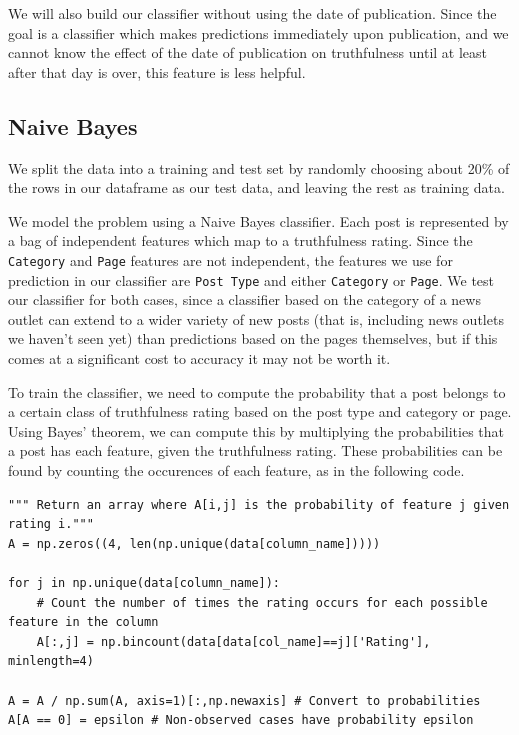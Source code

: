 \documentclass[12pt]{article}
\begin{document}
We will also build our classifier without using the date of publication. Since the goal is a classifier which makes predictions immediately upon publication, and we cannot know the effect of the date of publication on truthfulness until at least after that day is over, this feature is less helpful.


\subsection*{Naive Bayes}

We split the data into a training and test set by randomly choosing about 20\% of the rows in our dataframe as our test data, and leaving the rest as training data. 

We model the problem using a Naive Bayes classifier. Each post is represented by a bag of independent features which map to a truthfulness rating. Since the \texttt{Category} and \texttt{Page} features are not independent, the features we use for prediction in our classifier are \texttt{Post Type} and either \texttt{Category} or \texttt{Page}. We test our classifier for both cases, since a classifier based on the category of a news outlet can extend to a wider variety of new posts (that is, including news outlets we haven't seen yet) than predictions based on the pages themselves, but if this comes at a significant cost to accuracy it may not be worth it.

To train the classifier, we need to compute the probability that a post belongs to a certain class of truthfulness rating based on the post type and category or page. Using Bayes' theorem, we can compute this by multiplying the probabilities that a post has each feature, given the truthfulness rating. These probabilities can be found by counting the occurences of each feature, as in the following code.

\begin{lstlisting}
""" Return an array where A[i,j] is the probability of feature j given rating i."""
A = np.zeros((4, len(np.unique(data[column_name]))))

for j in np.unique(data[column_name]):
    # Count the number of times the rating occurs for each possible feature in the column
    A[:,j] = np.bincount(data[data[col_name]==j]['Rating'], minlength=4)

A = A / np.sum(A, axis=1)[:,np.newaxis] # Convert to probabilities
A[A == 0] = epsilon # Non-observed cases have probability epsilon
\end{lstlisting}
\end{document}
